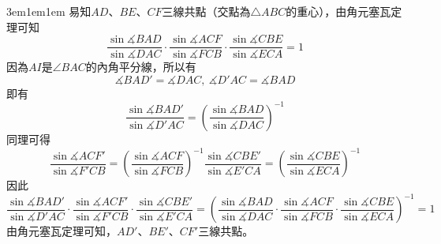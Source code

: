 \documentclass[12pt]{article}
\begin{document}
\begin{mybox}[解]{3em}{1em}{1em}
    易知$AD$、$BE$、$CF$三線共點（交點為$\triangle{ABC}$的重心），由角元塞瓦定理可知
    $$
        \frac{\sin{\measuredangle{BAD}}}{\sin{\measuredangle{DAC}}}
        \cdot\frac{\sin{\measuredangle{ACF}}}{\sin{\measuredangle{FCB}}}
        \cdot\frac{\sin{\measuredangle{CBE}}}{\sin{\measuredangle{ECA}}} = 1
    $$
    因為$AI$是$\angle{BAC}$的內角平分線，所以有
    $$
        \measuredangle{BAD'}=\measuredangle{DAC},\ \measuredangle{D'AC}=\measuredangle{BAD}
    $$
    即有
    $$
        \frac{\sin{\measuredangle{BAD'}}}{\sin{\measuredangle{D'AC}}}=\left(\frac{\sin{\measuredangle{BAD}}}{\sin{\measuredangle{DAC}}}\right)^{-1}
    $$
    同理可得
    $$
        \frac{\sin{\measuredangle{ACF'}}}{\sin{\measuredangle{F'CB}}}=\left(\frac{\sin{\measuredangle{ACF}}}{\sin{\measuredangle{FCB}}}\right)^{-1}
        \frac{\sin{\measuredangle{CBE'}}}{\sin{\measuredangle{E'CA}}}=\left(\frac{\sin{\measuredangle{CBE}}}{\sin{\measuredangle{ECA}}}\right)^{-1}
    $$
    因此
    $$
        \frac{\sin{\measuredangle{BAD'}}}{\sin{\measuredangle{D'AC}}}
        \cdot\frac{\sin{\measuredangle{ACF'}}}{\sin{\measuredangle{F'CB}}}
        \cdot\frac{\sin{\measuredangle{CBE'}}}{\sin{\measuredangle{E'CA}}}=\left(\frac{\sin{\measuredangle{BAD}}}{\sin{\measuredangle{DAC}}}
        \cdot\frac{\sin{\measuredangle{ACF}}}{\sin{\measuredangle{FCB}}}
        \cdot\frac{\sin{\measuredangle{CBE}}}{\sin{\measuredangle{ECA}}}\right)^{-1}=1
    $$
    由角元塞瓦定理可知，$AD'$、$BE'$、$CF'$三線共點。
\end{mybox}
\end{document}
